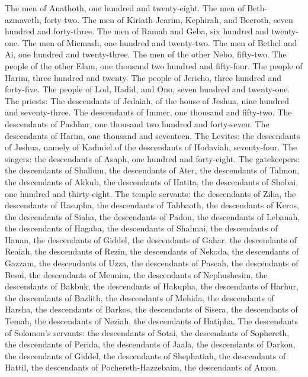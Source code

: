 \begin{biblechapter}
\verse The men of Anathoth, one hundred and twenty-eight.
\verse The men of Beth-azmaveth, forty-two.
\verse The men of Kiriath-Jearim, Kephirah, and Beeroth, seven hundred and forty-three.
\verse The men of Ramah and Geba, six hundred and twenty-one.
\verse The men of Micmash, one hundred and twenty-two.
\verse The men of Bethel and Ai, one hundred and twenty-three.
\verse The men of the other Nebo, fifty-two.
\verse The people of the other Elam, one thousand two hundred and fifty-four.
\verse The people of Harim, three hundred and twenty.
\verse The people of Jericho, three hundred and forty-five.
\verse The people of Lod, Hadid, and Ono, seven hundred and twenty-one.
\verse The priests: The descendants of Jedaiah, of the house of Jeshua, nine hundred and seventy-three.
\verse The descendants of Immer, one thousand and fifty-two.
\verse The descendants of Pashhur, one thousand two hundred and forty-seven.
\verse The descendants of Harim, one thousand and seventeen.
\verse The Levites: the descendants of Jeshua, namely of Kadmiel of the descendants of Hodaviah, seventy-four.
\verse The singers: the descendants of Asaph, one hundred and forty-eight.
\verse The gatekeepers: the descendants of Shallum, the descendants of Ater, the descendants of Talmon, the descendants of Akkub, the descendants of Hatita, the descendants of Shobai, one hundred and thirty-eight.
\verse The temple servants: the descendants of Ziha, the descendants of Hasupha, the descendants of Tabbaoth,
\verse the descendants of Keros, the descendants of Siaha, the descendants of Padon,
\verse the descendants of Lebanah, the descendants of Hagaba, the descendants of Shalmai,
\verse the descendants of Hanan, the descendants of Giddel, the descendants of Gahar,
\verse the descendants of Reaiah, the descendants of Rezin, the descendants of Nekoda,
\verse the descendants of Gazzam, the descendants of Uzza, the descendants of Paseah,
\verse the descendants of Besai, the descendants of Meunim, the descendants of Nephushesim,
\verse the descendants of Bakbuk, the descendants of Hakupha, the descendants of Harhur,
\verse the descendants of Bazlith, the descendants of Mehida, the descendants of Harsha,
\verse the descendants of Barkos, the descendants of Sisera, the descendants of Temah,
\verse the descendants of Neziah, the descendants of Hatipha.
\verse The descendants of Solomon’s servants: the descendants of Sotai, the descendants of Sophereth, the descendants of Perida,
\verse the descendants of Jaala, the descendants of Darkon, the descendants of Giddel,
\verse the descendants of Shephatiah, the descendants of Hattil, the descendants of Pochereth-Hazzebaim, the descendants of Amon.

\end{biblechapter}
